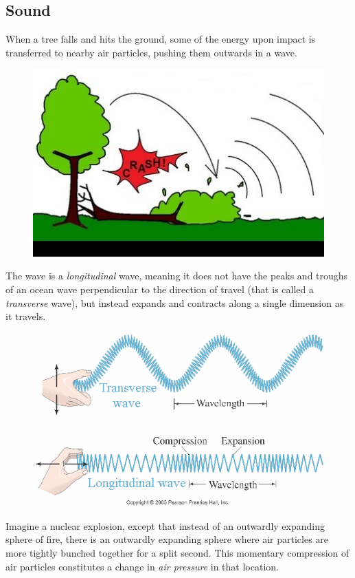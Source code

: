\documentclass[UTF8]{book}
\begin{document}
\begin{CJK}{UTF8}{gbsn}
\section{Sound}

When a tree falls and hits the ground, some of the energy upon impact is transferred to nearby air particles, pushing them outwards in a wave.

\begin{figure}[H]
\centering
\includegraphics[width=0.8\linewidth]{treefalling_edited}
\end{figure}

The wave is a \emph{longitudinal} wave, meaning it does not have the peaks and troughs of an ocean wave perpendicular to the direction of travel (that is called a \emph{transverse} wave), but instead expands and contracts along a single dimension as it travels.

\begin{figure}[H]
\centering
\includegraphics[width=0.8\linewidth]{longvstransvwave}
\end{figure}

Imagine a nuclear explosion, except that instead of an outwardly expanding sphere of fire, there is an outwardly expanding sphere where air particles are more tightly bunched together for a split second. This momentary compression of air particles constitutes a change in \emph{air pressure} in that location.


\end{CJK}
\end{document}
